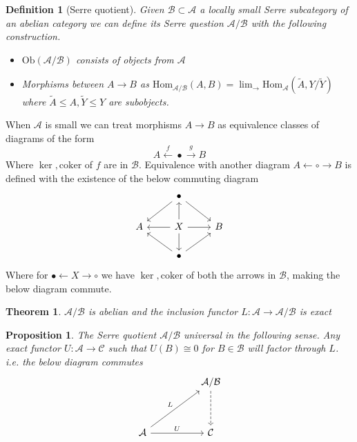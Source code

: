 \documentclass[12pt]{report}
\numberwithin{equation}{section}
\newcommand{\Hom}{{\mathrm{Hom}}}
\newtheorem{theorem}[dummy]{Theorem}
\newtheorem{definition}[dummy]{Definition}
\newtheorem{proposition}[dummy]{Proposition}
\begin{document}
	\begin{definition}[Serre quotient]
		Given $\mathcal{B} \subset \mathcal{A}$ a locally small Serre subcategory of an abelian category we can define its Serre question $\mathcal{A}/\mathcal{B}$ with the following construction. \begin{itemize}
			\item $\mathrm{Ob}(\mathcal{A}/\mathcal{B})$ consists of objects from $\mathcal{A}$
			\item Morphisms between $A\to B$ as $\Hom_{\mathcal{A}/\mathcal{B}} (A,B) =  \lim_\to \Hom_\mathcal{A} (\tilde A, Y/\tilde Y)$ where $\tilde A \leq A, \tilde Y \leq Y$ are subobjects.
		\end{itemize}
	\end{definition}
	When $\mathcal{A}$ is small we can treat morphisms $A \to B $ as equivalence classes of diagrams of the form \[ A \xleftarrow{f} \bullet \xrightarrow{g} B \]
	Where $\ker, \mathrm{coker}$ of $f$ are in $\mathcal{B}$. Equivalence with another diagram $A \leftarrow \circ \rightarrow B$ is defined with the existence of the below commuting diagram
	\[\begin{tikzcd}
		& \bullet \\
		A & X & B \\
		& \bullet
		\arrow[from=1-2, to=2-1]
		\arrow[from=1-2, to=2-3]
		\arrow[from=2-2, to=1-2]
		\arrow[from=2-2, to=2-1]
		\arrow[from=2-2, to=2-3]
		\arrow[from=2-2, to=3-2]
		\arrow[from=3-2, to=2-1]
		\arrow[from=3-2, to=2-3]
	\end{tikzcd}\]
	Where for $\bullet \leftarrow X \rightarrow \circ $ we have $\ker,\mathrm{coker}$ of both the arrows in $\mathcal{B}$, making the below diagram commute.
	
	
	
	\begin{theorem}
		$\mathcal{A/B}$ is abelian and the inclusion functor $L:\mathcal{A} \to \mathcal{A/B}$ is exact
	\end{theorem}
	\begin{proposition}
		The Serre quotient $\mathcal{A/B}$ universal in the following sense. Any exact functor $U: \mathcal{A} \to \mathcal{C}$ such that $U(B)\cong 0$ for $B \in \mathcal{B}$ will factor through $L$. i.e. the below diagram commutes	
		\[\begin{tikzcd}
			&& {\mathcal{A/B}} \\
			\\
			{\mathcal{A}} && {\mathcal{C}}
			\arrow[dashed, from=1-3, to=3-3]
			\arrow["L", from=3-1, to=1-3]
			\arrow["U", from=3-1, to=3-3]
		\end{tikzcd}\]
	\end{proposition}
	
\end{document}
